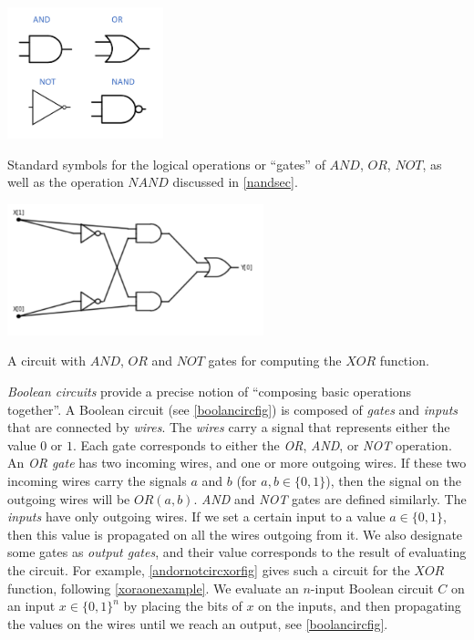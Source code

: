 \begin{marginfigure}
\centering
\includegraphics[width=\linewidth, height=1.5in, keepaspectratio]{../figure/logicgates.png}
\caption{Standard symbols for the logical operations or ``gates'' of
\(\ensuremath{\mathit{AND}}\), \(\ensuremath{\mathit{OR}}\),
\(\ensuremath{\mathit{NOT}}\), as well as the operation
\(\ensuremath{\mathit{NAND}}\) discussed in \cref{nandsec}.}
\label{logicgatesfig}
\end{marginfigure}


\begin{marginfigure}
\centering
\includegraphics[width=\linewidth, height=1.5in, keepaspectratio]{../figure/xorcircuitschemdraw.png}
\caption{A circuit with \(\ensuremath{\mathit{AND}}\),
\(\ensuremath{\mathit{OR}}\) and \(\ensuremath{\mathit{NOT}}\) gates for
computing the \(\ensuremath{\mathit{XOR}}\) function.}
\label{andornotcircxorfig}
\end{marginfigure}

\emph{Boolean circuits} provide a precise notion of ``composing basic
operations together''. A Boolean circuit (see \cref{boolancircfig}) is
composed of \emph{gates} and \emph{inputs} that are connected by
\emph{wires}. The \emph{wires} carry a signal that represents either the
value \(0\) or \(1\). Each gate corresponds to either the \emph{OR},
\emph{AND}, or \emph{NOT} operation. An \emph{OR gate} has two incoming
wires, and one or more outgoing wires. If these two incoming wires carry
the signals \(a\) and \(b\) (for \(a,b \in \{0,1\}\)), then the signal
on the outgoing wires will be \(\ensuremath{\mathit{OR}}(a,b)\).
\emph{AND} and \emph{NOT} gates are defined similarly. The \emph{inputs}
have only outgoing wires. If we set a certain input to a value
\(a\in \{0,1\}\), then this value is propagated on all the wires
outgoing from it. We also designate some gates as \emph{output gates},
and their value corresponds to the result of evaluating the circuit. For
example, \cref{andornotcircxorfig} gives such a circuit for the
\(\ensuremath{\mathit{XOR}}\) function, following \cref{xoraonexample}.
We evaluate an \(n\)-input Boolean circuit \(C\) on an input
\(x\in \{0,1\}^n\) by placing the bits of \(x\) on the inputs, and then
propagating the values on the wires until we reach an output, see
\cref{boolancircfig}.

